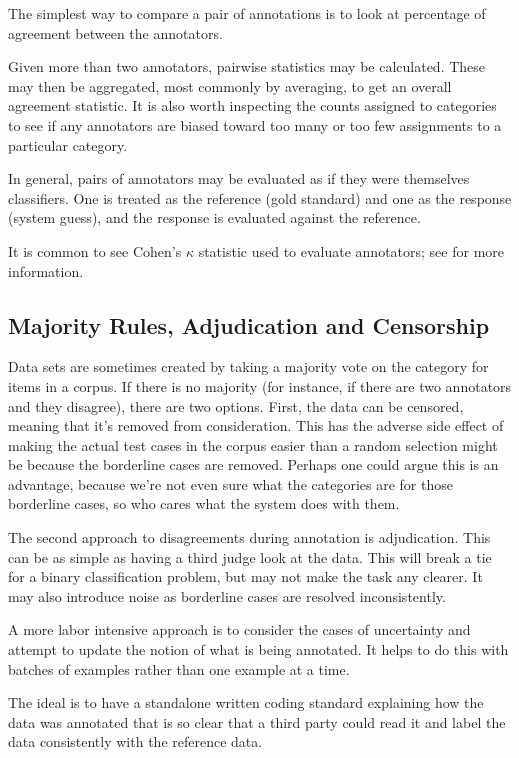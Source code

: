 The simplest way to compare a pair of annotations is to look at
percentage of agreement between the annotators.  

Given more than two annotators, pairwise statistics may be calculated.
These may then be aggregated, most commonly by averaging, to get an
overall agreement statistic.  It is also worth inspecting the counts
assigned to categories to see if any annotators are biased toward
too many or too few assignments to a particular category.

In general, pairs of annotators may be evaluated as if they were
themselves classifiers.  One is treated as the reference (gold
standard) and one as the response (system guess), and the response
is evaluated against the reference.  

It is common to see Cohen's $\kappa$ statistic used to evaluate
annotators; see  for more information.


\subsection{Majority Rules, Adjudication and Censorship}

Data sets are sometimes created by taking a majority vote on the
category for items in a corpus.  If there is no majority (for
instance, if there are two annotators and they disagree), there are
two options.  First, the data can be censored, meaning that it's
removed from consideration.  This has the adverse side effect of
making the actual test cases in the corpus easier than a random
selection might be because the borderline cases are removed.  Perhaps
one could argue this is an advantage, because we're not even sure what
the categories are for those borderline cases, so who cares what the
system does with them.  

The second approach to disagreements during annotation is
adjudication.  This can be as simple as having a third judge look at
the data.  This will break a tie for a binary classification problem,
but may not make the task any clearer.  It may also introduce noise
as borderline cases are resolved inconsistently.

A more labor intensive approach is to consider the cases of
uncertainty and attempt to update the notion of what is being
annotated.  It helps to do this with batches of examples rather than
one example at a time.  

The ideal is to have a standalone written coding standard explaining
how the data was annotated that is so clear that a third party could
read it and label the data consistently with the reference data.  



